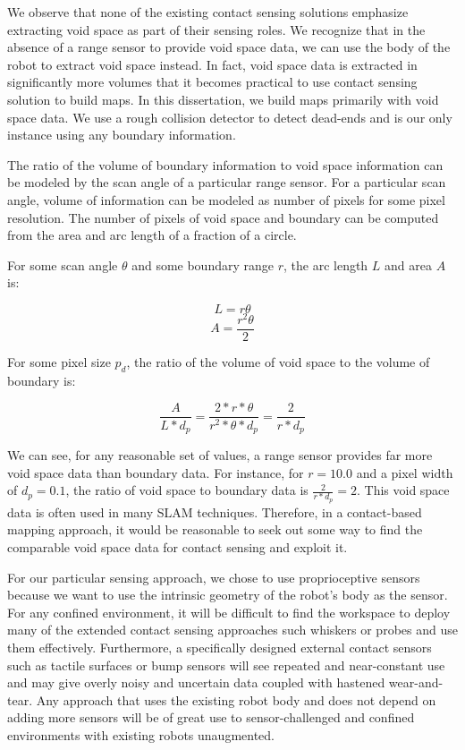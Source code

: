 We observe that none of the existing contact sensing solutions emphasize extracting void space as part of their sensing roles. We recognize that in the absence of a range sensor to provide void space data, we can use the body of the robot to extract void space instead. In fact, void space data is extracted in significantly more volumes that it becomes practical to use contact sensing solution to build maps. In this dissertation, we build maps primarily with void space data. We use a rough collision detector to detect dead-ends and is our only instance using any boundary information.

The ratio of the volume of boundary information to void space information can be modeled by the scan angle of a particular range sensor. For a particular scan angle, volume of information can be modeled as number of pixels for some pixel resolution. The number of pixels of void space and boundary can be computed from the area and arc length of a fraction of a circle.

For some scan angle $\theta$ and some boundary range $r$, the arc length $L$ and area $A$ is:


\begin{equation*}
L = r \theta
\end{equation*}
\begin{equation}
A = \frac{r^2 \theta}{2} 
\end{equation}


For some pixel size $p_d$, the ratio of the volume of void space to the volume of boundary is:


\begin{equation*}
\frac{A}{L*d_p}  = \frac{2 * r * \theta}{r^2 * \theta * d_p} = \frac{2}{r * d_p} 
\end{equation*}


We can see, for any reasonable set of values, a range sensor provides far more void space data than boundary data. For instance, for $r=10.0$ and a pixel width of $d_p = 0.1$, the ratio of void space to boundary data is $\frac{2}{r * d_p}= 2$. This void space data is often used in many SLAM techniques. Therefore, in a contact-based mapping approach, it would be reasonable to seek out some way to find the comparable void space data for contact sensing and exploit it.

For our particular sensing approach, we chose to use proprioceptive sensors because we want to use the intrinsic geometry of the robot's body as the sensor. For any confined environment, it will be difficult to find the workspace to deploy many of the extended contact sensing approaches such whiskers or probes and use them effectively. Furthermore, a specifically designed external contact sensors such as tactile surfaces or bump sensors will see repeated and near-constant use and may give overly noisy and uncertain data coupled with hastened wear-and-tear. Any approach that uses the existing robot body and does not depend on adding more sensors will be of great use to sensor-challenged and confined environments with existing robots unaugmented.

